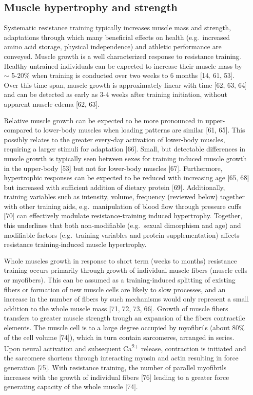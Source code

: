 \documentclass[twoside,10pt]{gihclass} %
\begin{document}
\hypertarget{muscle-hypertrophy-and-strength}{%
\subsection{Muscle hypertrophy and strength}\label{muscle-hypertrophy-and-strength}}

Systematic resistance training typically increases muscle mass and strength, adaptations through which many beneficial effects on health (e.g.~increased amino acid storage, physical independence) and athletic performance are conveyed.
Muscle growth is a well characterized response to resistance training.
Healthy untrained individuals can be expected to increase their muscle mass by \(\sim\) 5-20\% when training is conducted over two weeks to 6 months
{[}14, 61, 53{]}.
Over this time span, muscle growth is approximately linear with time
{[}62, 63, 64{]}
and can be detected as early as 3-4 weeks after training initiation, without apparent muscle edema
{[}62, 63{]}.

Relative muscle growth can be expected to be more pronounced in upper- compared to lower-body muscles when loading patterns are similar
{[}61, 65{]}.
This possibly relates to the greater every-day activation of lower-body muscles, requiring a larger stimuli for adaptation
{[}66{]}.
Small, but detectable differences in muscle growth is typically seen between sexes for training induced muscle growth in the upper-body
{[}53{]}
but not for lower-body muscles
{[}67{]}.
Furthermore, hypertrophic responses can be expected to be reduced with increasing age
{[}65, 68{]}
but increased with sufficient addition of dietary protein
{[}69{]}.
Additionally, training variables such as intensity, volume, frequency (reviewed below) together with other training aids, e.g.~manipulation of blood flow through pressure cuffs
{[}70{]}
can effectively modulate resistance-training induced hypertrophy.
Together, this underlines that both non-modifiable (e.g.~sexual dimorphism and age) and modifiable factors (e.g.~training variables and protein supplementation) affects resistance training-induced muscle hypertrophy.

Whole muscles growth in response to short term (weeks to months) resistance training occurs primarily through growth of individual muscle fibers (muscle cells or myofibers).
This can be assumed as a training-induced splitting of existing fibers or formation of new muscle cells are likely to slow processes, and an increase in the number of fibers by such mechanisms would only represent a small addition to the whole muscle mass
{[}71, 72, 73, 66{]}.
Growth of muscle fibers transfers to greater muscle strength trough an expansion of the fibers contractile elements.
The muscle cell is to a large degree occupied by myofibrils
(about 80\% of the cell volume
{[}74{]}),
which in turn contain sarcomeres, arranged in series.
Upon neural activation and subsequent Ca\textsuperscript{2+} release, contraction is initiated and the sarcomere shortens through interacting myosin and actin resulting in force generation
{[}75{]}.
With resistance training, the number of parallel myofibrils increases with the growth of individual fibers
{[}76{]}
leading to a greater force generating capacity of the whole muscle
{[}74{]}.
\end{document}
